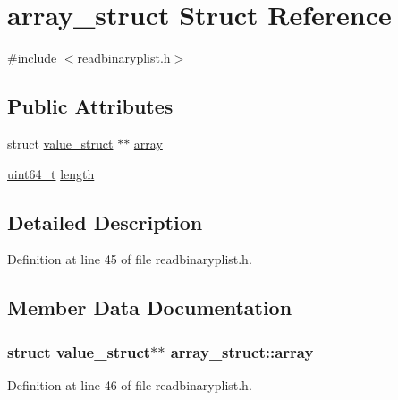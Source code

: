 \hypertarget{structarray__struct}{}\section{array\+\_\+struct Struct Reference}
\label{structarray__struct}


{\ttfamily \#include $<$readbinaryplist.\+h$>$}

\subsection*{Public Attributes}
\begin{DoxyCompactItemize}
\item 
struct \hyperlink{structvalue__struct}{value\+\_\+struct} $\ast$$\ast$ \hyperlink{structarray__struct_ab25fc397ed68afbba0080e1cfc960832}{array}
\item 
\hyperlink{lib-src_2ffmpeg_2win32_2stdint_8h_aec6fcb673ff035718c238c8c9d544c47}{uint64\+\_\+t} \hyperlink{structarray__struct_a2cc7486bd91ad9da51edd7a4cbc46a35}{length}
\end{DoxyCompactItemize}


\subsection{Detailed Description}


Definition at line 45 of file readbinaryplist.\+h.



\subsection{Member Data Documentation}
\subsubsection[{\texorpdfstring{array}{array}}]{\setlength{\rightskip}{0pt plus 5cm}struct {\bf value\+\_\+struct}$\ast$$\ast$ array\+\_\+struct\+::array}\hypertarget{structarray__struct_ab25fc397ed68afbba0080e1cfc960832}{}\label{structarray__struct_ab25fc397ed68afbba0080e1cfc960832}


Definition at line 46 of file readbinaryplist.\+h.

